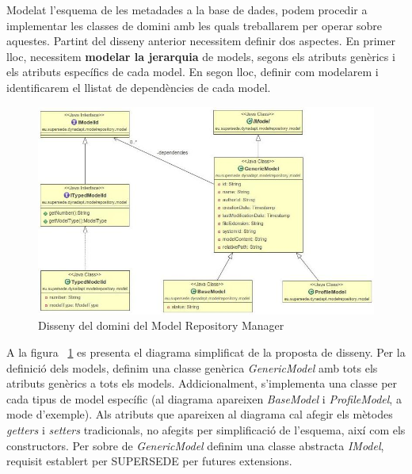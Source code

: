 Modelat l'esquema de les metadades a la base de dades, podem procedir a implementar les classes de domini amb les quals treballarem per operar sobre aquestes. Partint del disseny anterior necessitem definir dos aspectes. En primer lloc, necessitem \textbf{modelar la jerarquia} de models, segons els atributs genèrics i els atributs específics de cada model. En segon lloc, definir com modelarem i identificarem el llistat de dependències de cada model.\\

\begin{figure}
\centering
\includegraphics[width=14cm]{Figures/Figure21}
\decoRule
\caption{Disseny del domini del Model Repository Manager}
\label{fig:Figura21}
\end{figure}

A la figura ~\ref{fig:Figura21} es presenta el diagrama simplificat de la proposta de disseny. Per la definició dels models, definim una classe genèrica \textit{GenericModel} amb tots els atributs genèrics a tots els models. Addicionalment, s'implementa una classe per cada tipus de model específic (al diagrama apareixen \textit{BaseModel} i \textit{ProfileModel}, a mode d'exemple). Als atributs que apareixen al diagrama cal afegir els mètodes \textit{getters} i \textit{setters} tradicionals, no afegits per simplificació de l'esquema, així com els constructors. Per sobre de \textit{GenericModel} definim una classe abstracta \textit{IModel}, requisit establert per SUPERSEDE per futures extensions. \\

